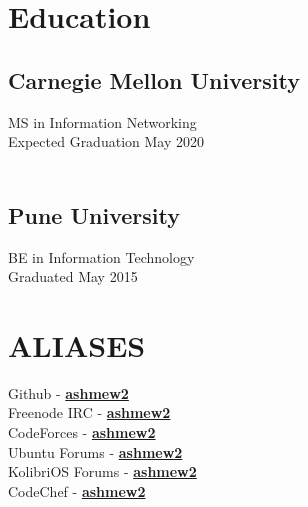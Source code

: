 \documentclass[letterpaper]{deedy-resume-openfont} %
\begin{document}
\lastupdated %
\begin{minipage}[t]{0.33\textwidth} %
\section{Education}

\subsection[Carnegie Mellon University]{Carnegie Mellon \newline University}
MS in Information Networking \\
Expected Graduation May 2020 \\
\  \\ %

\subsection{Pune University}
BE in Information Technology \\
Graduated May 2015 \\
\sectionsep %
\section{ALIASES}
Github - \href{https://github.com/ashmew2}{\bf ashmew2} \\
Freenode IRC - \href{http://freenode.org} {\bf ashmew2} \\
CodeForces - \href{http://codeforces.com/profile/ashmew2}{\bf ashmew2} \\
Ubuntu Forums - \href{http://ubuntuforums.org/showthread.php?t=821461} {\bf ashmew2} \\
KolibriOS Forums - \href{http://board.kolibrios.org/memberlist.php?mode=viewprofile&u=6211} {\bf ashmew2} \\
CodeChef - \href{http://www.codechef.com/users/ashmew2}{\bf ashmew2} \\
\sectionsep %

\end{minipage}
\end{document}

